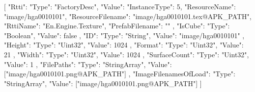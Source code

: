 [{
        "Rtti": {
            "Type": "FactoryDesc",
            "Value": {
                "InstanceType": 5,
                "ResourceName": "image/hga0010101",
                "ResourceFilename": "image/hga0010101.tex@APK_PATH",
                "RttiName": "En.Engine.Texture",
                "PrefabFilename": ""
            }
        },
        "IsCube": {
            "Type": "Boolean",
            "Value": false
        },
        "ID": {
            "Type": "String",
            "Value": "image/hga0010101"
        },
        "Height": {
            "Type": "Uint32",
            "Value": 1024
        },
        "Format": {
            "Type": "Uint32",
            "Value": 21
        },
        "Width": {
            "Type": "Uint32",
            "Value": 1024
        },
        "SurfaceCount": {
            "Type": "Uint32",
            "Value": 1
        },
        "FilePaths": {
            "Type": "StringArray",
            "Value": ["image/hga0010101.png@APK_PATH"]
        },
        "ImageFilenamesOfLoad": {
            "Type": "StringArray",
            "Value": ["image/hga0010101.png@APK_PATH"]
        }
    }]